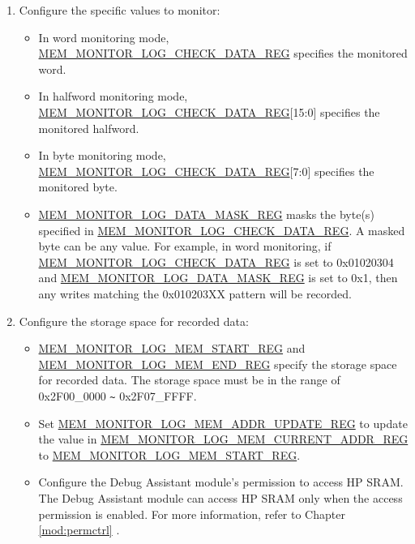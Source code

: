 \documentclass[main\_\_EN.tex]{subfiles}
\begin{document}
\begin{enumerate}
\begin{itemize}
            \item 8: Byte monitoring (detects write operations of a specific byte)
        \end{itemize}
    \item Configure the specific values to monitor:
       \begin{itemize}
            \item In word monitoring mode, \hyperref[regdesc:MEMMONITORLOGCHECKDATAREG]{MEM\_MONITOR\_LOG\_CHECK\_DATA\_REG} specifies the monitored word.
            \item In halfword monitoring mode, \hyperref[regdesc:MEMMONITORLOGCHECKDATAREG]{MEM\_MONITOR\_LOG\_CHECK\_DATA\_REG}[15:0] specifies the monitored halfword.
            \item In byte monitoring mode, \hyperref[regdesc:MEMMONITORLOGCHECKDATAREG]{MEM\_MONITOR\_LOG\_CHECK\_DATA\_REG}[7:0] specifies the monitored byte.
            \item \hyperref[regdesc:MEMMONITORLOGDATAMASKREG]{MEM\_MONITOR\_LOG\_DATA\_MASK\_REG} masks the byte(s) specified in \hyperref[regdesc:MEMMONITORLOGCHECKDATAREG]{MEM\_MONITOR\_LOG\_CHECK\_DATA\_REG}. A masked byte can be any value. For example, in word monitoring, if \hyperref[regdesc:MEMMONITORLOGCHECKDATAREG]{MEM\_MONITOR\_LOG\_CHECK\_DATA\_REG} is set to 0x01020304 and \hyperref[regdesc:MEMMONITORLOGDATAMASKREG]{MEM\_MONITOR\_LOG\_DATA\_MASK\_REG} is set to 0x1, then any writes matching the 0x010203XX pattern will be recorded.
        \end{itemize}
    \item Configure the storage space for recorded data:
        \begin{itemize}
            \item \hyperref[regdesc:MEMMONITORLOGMEMSTARTREG]{MEM\_MONITOR\_LOG\_MEM\_START\_REG} and \hyperref[regdesc:MEMMONITORLOGMEMENDREG]{MEM\_MONITOR\_LOG\_MEM\_END\_REG} specify the storage space for recorded data. The storage space must be in the range of 0x2F00\_0000 \verb+~+ 0x2F07\_FFFF.
            \item Set \hyperref[regdesc:MEMMONITORLOGMEMADDRUPDATEREG]{MEM\_MONITOR\_LOG\_MEM\_ADDR\_UPDATE\_REG} to update the value in \hyperref[regdesc:MEMMONITORLOGMEMCURRENTADDRREG]{MEM\_MONITOR\_LOG\_MEM\_CURRENT\_ADDR\_REG} to \hyperref[regdesc:MEMMONITORLOGMEMSTARTREG]{MEM\_MONITOR\_LOG\_MEM\_START\_REG}.
            \item Configure the Debug Assistant module's permission to access HP SRAM. The Debug Assistant module can access HP SRAM only when the access permission is enabled. For more information, refer to Chapter \ref{mod:permctrl} \textit{}.

\end{itemize}
\end{enumerate}
\end{document}
